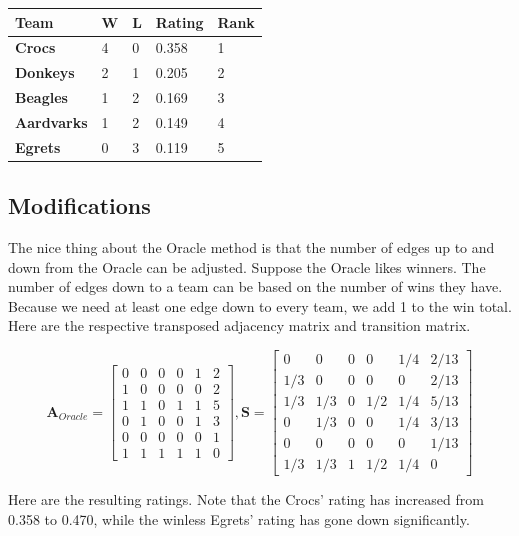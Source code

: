\documentclass[
]{book}
\theoremstyle{definition}
\theoremstyle{definition}
\theoremstyle{definition}
\theoremstyle{definition}
\theoremstyle{remark}
\begin{document}
\begin{longtable}[]{@{}lllll@{}}
\toprule\noalign{}
\textbf{Team} & W & L & Rating & Rank \\
\midrule\noalign{}
\endhead
\bottomrule\noalign{}
\endlastfoot
\textbf{Crocs} & 4 & 0 & 0.358 & 1 \\
\textbf{Donkeys} & 2 & 1 & 0.205 & 2 \\
\textbf{Beagles} & 1 & 2 & 0.169 & 3 \\
\textbf{Aardvarks} & 1 & 2 & 0.149 & 4 \\
\textbf{Egrets} & 0 & 3 & 0.119 & 5 \\
\end{longtable}

\subsection*{Modifications}\label{modifications}

The nice thing about the Oracle method is that the number of edges up to and down from the Oracle can be adjusted. Suppose the Oracle likes winners. The number of edges down to a team can be based on the number of wins they have. Because we need at least one edge down to every team, we add 1 to the win total. Here are the respective transposed adjacency matrix and transition matrix.

\[\textbf{A}_{Oracle}=\begin{bmatrix} 0 & 0 & 0 & 0 & 1 & 2 \\ 
   1 & 0 & 0 & 0 & 0 & 2 \\ 
   1 & 1 & 0 & 1 & 1 & 5 \\ 
   0 & 1 & 0 & 0 & 1 & 3 \\ 
   0 & 0 & 0 & 0 & 0 & 1 \\ 
 1 & 1 & 1 & 1 & 1 & 0\end{bmatrix},\textbf{S}=\begin{bmatrix} 0 & 0 & 0 & 0 & 1/4 & 2/13 \\ 1/3 & 0 & 0 & 0 & 0 & 2/13\\
  1/3 & 1/3 & 0 & 1/2 & 1/4 & 5/13 \\ 
   0 & 1/3 & 0 & 0 & 1/4 & 3/13 \\ 
   0 & 0 & 0 & 0 & 0 & 1/13 \\ 
  1/3 & 1/3 & 1 & 1/2 & 1/4 & 0\end{bmatrix}\]

Here are the resulting ratings. Note that the Crocs' rating has increased from 0.358 to 0.470, while the winless Egrets' rating has gone down significantly.
\end{document}
